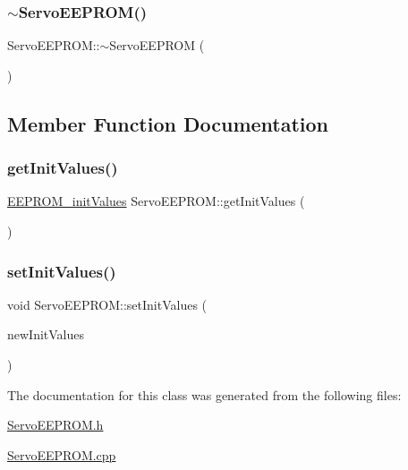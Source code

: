 \mbox{\label{class_servo_e_e_p_r_o_m_a5cecb1d16d1dbd8cf1530a808288451d}} 
\subsubsection{\texorpdfstring{$\sim$\+Servo\+E\+E\+P\+R\+O\+M()}{~ServoEEPROM()}}
{\footnotesize\ttfamily Servo\+E\+E\+P\+R\+O\+M\+::$\sim$\+Servo\+E\+E\+P\+R\+OM (\begin{DoxyParamCaption}{ }\end{DoxyParamCaption})}



\subsection{Member Function Documentation}
\mbox{\label{class_servo_e_e_p_r_o_m_ac6e03a1694107eed257a171e01d37029}} 
\subsubsection{\texorpdfstring{get\+Init\+Values()}{getInitValues()}}
{\footnotesize\ttfamily \hyperlink{struct_e_e_p_r_o_m__init_values}{E\+E\+P\+R\+O\+M\+\_\+init\+Values} Servo\+E\+E\+P\+R\+O\+M\+::get\+Init\+Values (\begin{DoxyParamCaption}{ }\end{DoxyParamCaption})}

\mbox{\label{class_servo_e_e_p_r_o_m_a0051b754f421b6bf445382e451e49c46}} 
\subsubsection{\texorpdfstring{set\+Init\+Values()}{setInitValues()}}
{\footnotesize\ttfamily void Servo\+E\+E\+P\+R\+O\+M\+::set\+Init\+Values (\begin{DoxyParamCaption}\item[{\hyperlink{struct_e_e_p_r_o_m__init_values}{E\+E\+P\+R\+O\+M\+\_\+init\+Values}}]{new\+Init\+Values }\end{DoxyParamCaption})}



The documentation for this class was generated from the following files\+:\begin{DoxyCompactItemize}
\item 
\hyperlink{_servo_e_e_p_r_o_m_8h}{Servo\+E\+E\+P\+R\+O\+M.\+h}\item 
\hyperlink{_servo_e_e_p_r_o_m_8cpp}{Servo\+E\+E\+P\+R\+O\+M.\+cpp}\end{DoxyCompactItemize}
